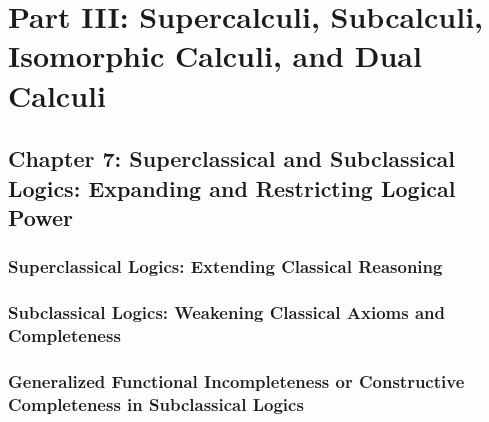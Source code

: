\hypertarget{part-iii-supercalculi-subcalculi-isomorphic-calculi-and-dual-calculi}{%
\section*{Part III: Supercalculi, Subcalculi, Isomorphic Calculi, and
Dual
Calculi}\label{part-iii-supercalculi-subcalculi-isomorphic-calculi-and-dual-calculi}}

\hypertarget{chapter-7-superclassical-and-subclassical-logics-expanding-and-restricting-logical-power}{%
\subsection*{Chapter 7: Superclassical and Subclassical Logics:
Expanding and Restricting Logical
Power}\label{chapter-7-superclassical-and-subclassical-logics-expanding-and-restricting-logical-power}}

\hypertarget{superclassical-logics-extending-classical-reasoning}{%
\subsubsection*{Superclassical Logics: Extending Classical
Reasoning}\label{superclassical-logics-extending-classical-reasoning}}

\hypertarget{subclassical-logics-weakening-classical-axioms-and-completeness}{%
\subsubsection*{Subclassical Logics: Weakening Classical Axioms and
Completeness}\label{subclassical-logics-weakening-classical-axioms-and-completeness}}

\hypertarget{generalized-functional-incompleteness-or-constructive-completeness-in-subclassical-logics}{%
\subsubsection*{Generalized Functional Incompleteness or Constructive
Completeness in Subclassical
Logics}\label{generalized-functional-incompleteness-or-constructive-completeness-in-subclassical-logics}}

